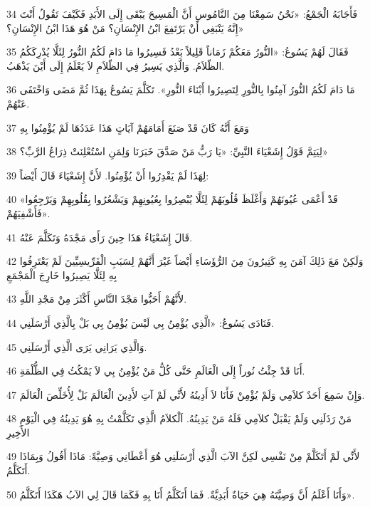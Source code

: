 \par 34 فَأَجَابَهُ الْجَمْعُ: «نَحْنُ سَمِعْنَا مِنَ النَّامُوسِ أَنَّ الْمَسِيحَ يَبْقَى إِلَى الأَبَدِ فَكَيْفَ تَقُولُ أَنْتَ إِنَّهُ يَنْبَغِي أَنْ يَرْتَفِعَ ابْنُ الإِنْسَانِ؟ مَنْ هُوَ هَذَا ابْنُ الإِنْسَانِ؟»
\par 35 فَقَالَ لَهُمْ يَسُوعُ: «النُّورُ مَعَكُمْ زَمَاناً قَلِيلاً بَعْدُ فَسِيرُوا مَا دَامَ لَكُمُ النُّورُ لِئَلَّا يُدْرِكَكُمُ الظّلاَمُ. وَالَّذِي يَسِيرُ فِي الظّلاَمِ لاَ يَعْلَمُ إِلَى أَيْنَ يَذْهَبُ.
\par 36 مَا دَامَ لَكُمُ النُّورُ آمِنُوا بِالنُّورِ لِتَصِيرُوا أَبْنَاءَ النُّورِ». تَكَلَّمَ يَسُوعُ بِهَذَا ثُمَّ مَضَى وَاخْتَفَى عَنْهُمْ.
\par 37 وَمَعَ أَنَّهُ كَانَ قَدْ صَنَعَ أَمَامَهُمْ آيَاتٍ هَذَا عَدَدُهَا لَمْ يُؤْمِنُوا بِهِ
\par 38 لِيَتِمَّ قَوْلُ إِشَعْيَاءَ النَّبِيِّ: «يَا رَبُّ مَنْ صَدَّقَ خَبَرَنَا وَلِمَنِ اسْتُعْلِنَتْ ذِرَاعُ الرَّبِّ؟»
\par 39 لِهَذَا لَمْ يَقْدِرُوا أَنْ يُؤْمِنُوا. لأَنَّ إِشَعْيَاءَ قَالَ أَيْضاً:
\par 40 «قَدْ أَعْمَى عُيُونَهُمْ وَأَغْلَظَ قُلُوبَهُمْ لِئَلَّا يُبْصِرُوا بِعُيُونِهِمْ وَيَشْعُرُوا بِقُلُوبِهِمْ وَيَرْجِعُوا فَأَشْفِيَهُمْ».
\par 41 قَالَ إِشَعْيَاءُ هَذَا حِينَ رَأَى مَجْدَهُ وَتَكَلَّمَ عَنْهُ.
\par 42 وَلَكِنْ مَعَ ذَلِكَ آمَنَ بِهِ كَثِيرُونَ مِنَ الرُّؤَسَاءِ أَيْضاً غَيْرَ أَنَّهُمْ لِسَبَبِ الْفَرِّيسِيِّينَ لَمْ يَعْتَرِفُوا بِهِ لِئَلَّا يَصِيرُوا خَارِجَ الْمَجْمَعِ
\par 43 لأَنَّهُمْ أَحَبُّوا مَجْدَ النَّاسِ أَكْثَرَ مِنْ مَجْدِ اللَّهِ.
\par 44 فَنَادَى يَسُوعُ: «الَّذِي يُؤْمِنُ بِي لَيْسَ يُؤْمِنُ بِي بَلْ بِالَّذِي أَرْسَلَنِي.
\par 45 وَالَّذِي يَرَانِي يَرَى الَّذِي أَرْسَلَنِي.
\par 46 أَنَا قَدْ جِئْتُ نُوراً إِلَى الْعَالَمِ حَتَّى كُلُّ مَنْ يُؤْمِنُ بِي لاَ يَمْكُثُ فِي الظُّلْمَةِ.
\par 47 وَإِنْ سَمِعَ أَحَدٌ كلاَمِي وَلَمْ يُؤْمِنْ فَأَنَا لاَ أَدِينُهُ لأَنِّي لَمْ آتِ لأَدِينَ الْعَالَمَ بَلْ لِأُخَلِّصَ الْعَالَمَ.
\par 48 مَنْ رَذَلَنِي وَلَمْ يَقْبَلْ كلاَمِي فَلَهُ مَنْ يَدِينُهُ. اَلْكلاَمُ الَّذِي تَكَلَّمْتُ بِهِ هُوَ يَدِينُهُ فِي الْيَوْمِ الأَخِيرِ
\par 49 لأَنِّي لَمْ أَتَكَلَّمْ مِنْ نَفْسِي لَكِنَّ الآبَ الَّذِي أَرْسَلَنِي هُوَ أَعْطَانِي وَصِيَّةً: مَاذَا أَقُولُ وَبِمَاذَا أَتَكَلَّمُ.
\par 50 وَأَنَا أَعْلَمُ أَنَّ وَصِيَّتَهُ هِيَ حَيَاةٌ أَبَدِيَّةٌ. فَمَا أَتَكَلَّمُ أَنَا بِهِ فَكَمَا قَالَ لِي الآبُ هَكَذَا أَتَكَلَّمُ».

